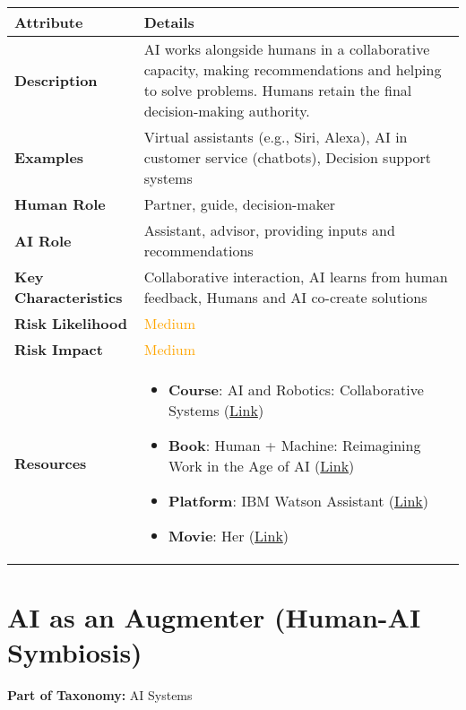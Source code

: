 \documentclass{article}
\begin{document}
\begin{longtable}{|p{4cm}|p{10cm}|}
\hline
\textbf{Attribute} & \textbf{Details} \\
\hline
\textbf{Description} & AI works alongside humans in a collaborative capacity, making recommendations and helping to solve problems. Humans retain the final decision-making authority. \\
\hline
\textbf{Examples} & Virtual assistants (e.g., Siri, Alexa), AI in customer service (chatbots), Decision support systems \\
\hline
\textbf{Human Role} & Partner, guide, decision-maker \\
\hline
\textbf{AI Role} & Assistant, advisor, providing inputs and recommendations \\
\hline
\textbf{Key Characteristics} & Collaborative interaction, AI learns from human feedback, Humans and AI co-create solutions \\
\hline
\textbf{Risk Likelihood} & \textcolor{orange}{Medium} \\
\hline
\textbf{Risk Impact} & \textcolor{orange}{Medium} \\
\hline
\textbf{Resources} & \begin{itemize}
  \item \textbf{Course}: AI and Robotics: Collaborative Systems (\href{https://www.futurelearn.com/courses/collaborative-ai}{Link})
  \item \textbf{Book}: Human + Machine: Reimagining Work in the Age of AI (\href{https://www.amazon.com/dp/1633693864}{Link})
  \item \textbf{Platform}: IBM Watson Assistant (\href{https://www.ibm.com/cloud/watson-assistant}{Link})
  \item \textbf{Movie}: Her (\href{https://www.imdb.com/title/tt1798709/}{Link})
\end{itemize} \\ \hline
\end{longtable}

\newpage
\section*{AI as an Augmenter (Human-AI Symbiosis)}
\noindent \textbf{Part of Taxonomy:} AI Systems
\end{document}
